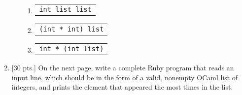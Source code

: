 \documentclass[11pt]{article}
\begin{document}
\begin{enumerate}
\begin{enumerate}
                  \newcommand{\ocamlquestionii}[1]{%
                    \begin{tabular}[t]{@{}p{2in}
                                       @{\underline{\hspace{4.17in}}}@{}}
                      \texttt{#1}
                    \end{tabular}
                  }

                  \vspace{2.5mm}

                  \begin{enumerate}

                    \addtolength{\itemsep}{7mm}

                    \renewcommand{\labelenumiii}{\arabic{enumiii})}

                    \item \ocamlquestionii{int list list}

                    \item \ocamlquestionii{(int * int) list}

                    \item \ocamlquestionii{int * (int list)}

                  \end{enumerate}

                  \vspace{-2.5mm}

          \end{enumerate}

          \medskip

          \ans[\linewidth]

          \medskip

          \begin{centering}

            \scratchpaper[\linewidth]

          \end{centering}

          \pagebreak



    \item {[30 pts.]} On the next page, write a complete Ruby program that
          reads an input line, which should be in the form of a valid,
          nonempty OCaml list of integers, and prints the element that
          appeared the most times in the list.


\end{enumerate}
\end{document}
